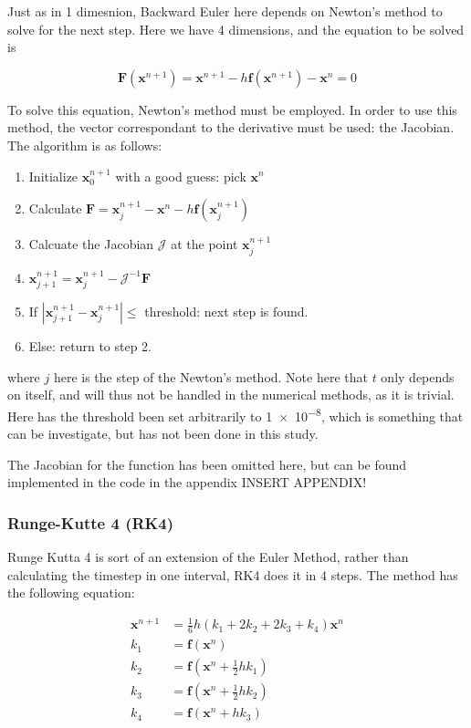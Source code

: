 Just as in 1 dimesnion, Backward Euler here depends on Newton's method to solve for the next step. Here we have 4 dimensions, and the equation to be solved is 

\begin{equation}
	\mathbf{F}(\mathbf{x}^{n+1}) = \mathbf{x}^{{n+1}} - h \mathbf{f}(\mathbf{x}^{{n+1}}) - \mathbf{x}^n = 0
\end{equation}

To solve this equation, Newton's method must be employed. In order to use this method, the vector correspondant to the derivative must be used: the Jacobian. The algorithm is as follows: 

\begin{enumerate}
	\item Initialize $\textbf{x}^{n+1}_0$ with a good guess: pick $\textbf{x}^n$
	\item Calculate $\textbf{F} = \textbf{x}^{n+1}_{j} - \textbf{x}^{n} - h \textbf{f}(\textbf{x}^{n+1}_{j})$
	\item Calcuate the Jacobian $\mathcal{J}$ at the point $\textbf{x}^{n+1}_{j}$
	\item $\textbf{x}^{n+1}_{j+1} = \textbf{x}^{n+1}_{j} - \mathcal{J}^{-1} \textbf{F}$
	\item If $|\textbf{x}^{n+1}_{j+1} - \textbf{x}^{n+1}_{j}| \le $ threshold: next step is found.
	\item Else: return to step 2.
\end{enumerate}

where $j$ here is the step of the Newton's method. Note here that $t$ only depends on itself, and will thus not be handled in the numerical methods, as it is trivial. Here has the threshold been set arbitrarily to \num{1e-8}, which is something that can be investigate, but has not been done in this study. 

The Jacobian for the function has been omitted here, but can be found implemented in the code in the appendix INSERT APPENDIX! 

\subsubsection{Runge-Kutte 4 (RK4)}

Runge Kutta 4 is sort of an extension of the Euler Method, rather than calculating the timestep in one interval, RK4 does it in 4 steps. The method has the following equation:


\begin{align}
	\textbf{x}^{n+1} &= \frac{1}{6}h(k_1 + 2k_2 + 2k_3 + k_4) \textbf{x}^n \\
	k_1 &= \textbf{f}(\textbf{x}^n) \\
	k_2 &= \textbf{f}(\textbf{x}^n + \frac{1}{2}h k_1) \\
	k_3 &= \textbf{f}(\textbf{x}^n + \frac{1}{2}h k_2) \\
	k_4 &= \textbf{f}(\textbf{x}^n + h k_3)
\end{align}

